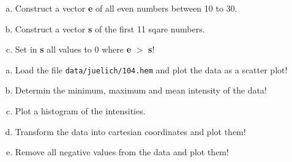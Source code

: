 \begin{frame}

  \begin{Exercise}
    \begin{enumerate}[a)]
      \item  Construct a vector \textbf{e} of all even numbers between 10 to 30.
      \item  Construct a vector \textbf{s} of the first 11 sqare numbers.
      \item  Set in \textbf{s} all values to 0 where \textbf{e} $>$ \textbf{s}!
    \end{enumerate}
  \end{Exercise}

  \begin{Exercise}
    \begin{enumerate}[a)]
    \item Load the file \texttt{data/juelich/104.hem} and plot the data as a
      scatter plot!
    \item Determin the minimum, maximum and mean
      intensity of the data!
    \item Plot a histogram of the intensities.
    \item Transform the data into cartesian coordinates and plot them!
    \item Remove all negative values from the data and plot them!
    \end{enumerate}
  \end{Exercise}
\end{frame}



